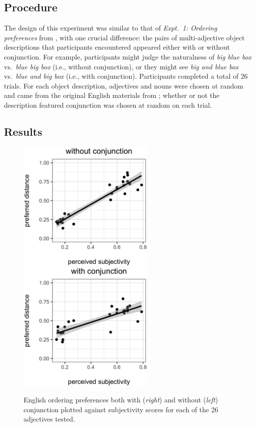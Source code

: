 \documentclass[12pt,letterpaper]{article}
\begin{document}
\subsection{Procedure}

The design of this experiment was similar to that of \emph{Expt.~1: Ordering preferences} from \cite{scontrasetal2017adjectives}, with one crucial difference: the pairs of multi-adjective object descriptions that participants encountered appeared either with or without conjunction. For example, participants might judge the naturalness of \emph{big blue box} vs.~\emph{blue big box} (i.e., without conjunction), or they might see \emph{big and blue box} vs.~\emph{blue and big box} (i.e., with conjunction). Participants completed a total of 26 trials. For each object description, adjectives and nouns were chosen at random and came from the original English materials from \cite{scontrasetal2017adjectives}; whether or not the description featured conjunction was chosen at random on each trial.

\subsection{Results}

\begin{figure}
	\centering
	\includegraphics[height=2.5in]{naturalness-subjectivity-NOconjunction-LSA.eps}		
	\quad \quad \quad
	\includegraphics[height=2.5in]{naturalness-subjectivity-conjunction.eps}
	\caption{English ordering preferences both with (\emph{right}) and without (\emph{left}) conjunction plotted against subjectivity scores for each of the 26 adjectives tested. %
	}
	\label{english-subj-comparison}
\end{figure}
\end{document}
